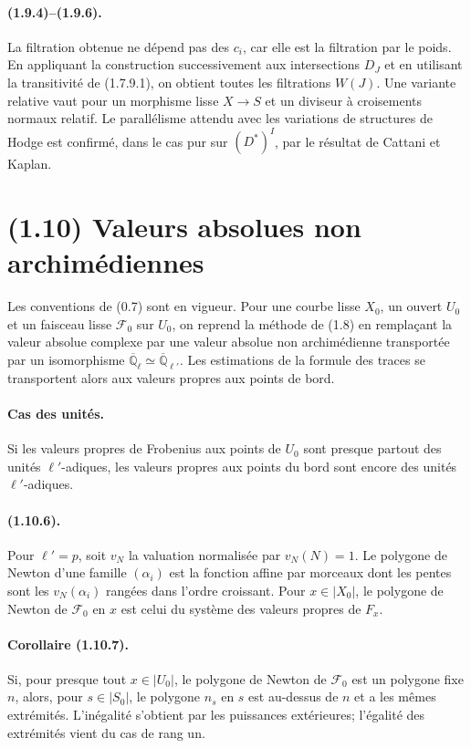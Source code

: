 \paragraph{(1.9.4)--(1.9.6).}
La filtration obtenue ne dépend pas des $c_i$, car elle est la filtration par le poids. En appliquant la construction successivement aux intersections $D_J$ et en utilisant la transitivité de (1.7.9.1), on obtient toutes les filtrations $W(J)$. Une variante relative vaut pour un morphisme lisse $X\to S$ et un diviseur à croisements normaux relatif. Le parallélisme attendu avec les variations de structures de Hodge est confirmé, dans le cas pur sur $(D^*)^I$, par le résultat de Cattani et Kaplan.

\section*{(1.10) Valeurs absolues non archimédiennes}

Les conventions de (0.7) sont en vigueur. Pour une courbe lisse $X_0$, un ouvert $U_0$ et un faisceau lisse $\mathcal F_0$ sur $U_0$, on reprend la méthode de (1.8) en remplaçant la valeur absolue complexe par une valeur absolue non archimédienne transportée par un isomorphisme $\overline{\mathbb Q}_\ell\simeq\overline{\mathbb Q}_{\ell'}$. Les estimations de la formule des traces se transportent alors aux valeurs propres aux points de bord.

\paragraph{Cas des unités.}
Si les valeurs propres de Frobenius aux points de $U_0$ sont presque partout des unités $\ell'$-adiques, les valeurs propres aux points du bord sont encore des unités $\ell'$-adiques.

\paragraph{(1.10.6).}
Pour $\ell'=p$, soit $v_N$ la valuation normalisée par $v_N(N)=1$. Le polygone de Newton d'une famille $(\alpha_i)$ est la fonction affine par morceaux dont les pentes sont les $v_N(\alpha_i)$ rangées dans l'ordre croissant. Pour $x\in |X_0|$, le polygone de Newton de $\mathcal F_0$ en $x$ est celui du système des valeurs propres de $F_x$.

\paragraph{Corollaire (1.10.7).}
Si, pour presque tout $x\in |U_0|$, le polygone de Newton de $\mathcal F_0$ est un polygone fixe $n$, alors, pour $s\in |S_0|$, le polygone $n_s$ en $s$ est au-dessus de $n$ et a les mêmes extrémités. L'inégalité s'obtient par les puissances extérieures; l'égalité des extrémités vient du cas de rang un.

